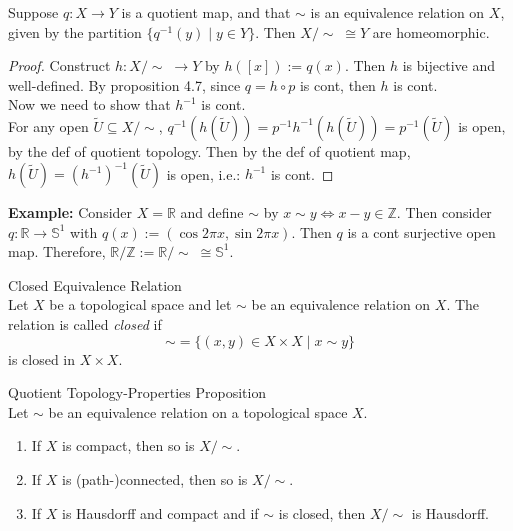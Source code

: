 \begin{proposition}
    Suppose $q : X \rightarrow Y$ is a quotient map, and that $\sim$ is an equivalence relation on $X$, given by the partition $\{ q^{-1} (y) \mid y \in Y\}$. Then $X/\sim \; \cong Y$ are homeomorphic.
\end{proposition}

\begin{proof}
    Construct $h : X/\sim \;\rightarrow Y$ by $h([x]) := q(x)$. Then $h$ is bijective and well-defined. By proposition 4.7, since $q = h\circ p$ is cont, then $h$ is cont.\\
    Now we need to show that $h^{-1}$ is cont.\\
    For any open $\widetilde{U} \subseteq X/\sim$, $q^{-1}(h(\widetilde{U})) = p^{-1} h^{-1} (h (\widetilde{U})) = p^{-1} (\widetilde{U})$ is open, by the def of quotient topology. Then by the def of quotient map, $h(\widetilde{U}) = (h^{-1})^{-1} (\widetilde{U})$ is open, i.e.: $h^{-1}$ is cont.
\end{proof}

\noindent\textbf{Example:} Consider $X =\mathbb{R}$ and define $\sim$ by $x \sim y \Leftrightarrow x-y \in \mathbb{Z}$. Then consider $q : \mathbb{R} \rightarrow \mathbb{S}^1$ with $q(x) := (\cos 2\pi x, \sin 2\pi x)$. Then $q$ is a cont surjective open map. Therefore, $\mathbb{R} / \mathbb{Z := \mathbb{R}/\sim \; \cong \mathbb{S}}^1$.

\begin{definition}{Closed Equivalence Relation}\\
Let $X$ be a topological space and let $\sim$ be an equivalence relation on $X$. The relation is called \textit{closed} if
$$\sim = \{ (x,y) \in X \times X \mid x \sim y \}$$
is closed in $X \times X$.
\end{definition}

\begin{proposition}{Quotient Topology-Properties Proposition}\\
Let $\sim$ be an equivalence relation on a topological space $X$.
\begin{enumerate}
    \item If $X$ is compact, then so is $X/\sim$.
    \item If $X$ is (path-)connected, then so is $X/\sim$.
    \item If $X$ is Hausdorff and compact and if $\sim$ is closed, then $X/\sim$ is Hausdorff.
\end{enumerate}
\end{proposition}

